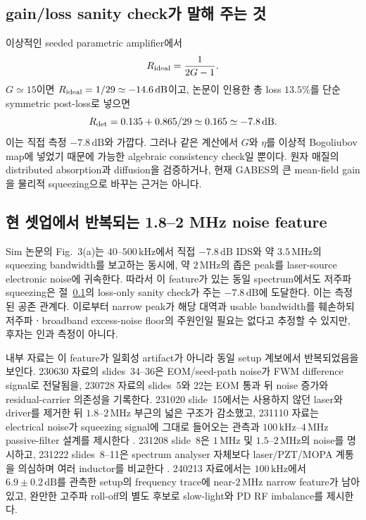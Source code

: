 \documentclass[11pt,a4paper]{article}
\newcommand{\MHz}{\,\mathrm{MHz}}
\newcommand{\kHz}{\,\mathrm{kHz}}
\newcommand{\dB}{\,\mathrm{dB}}
\begin{document}
\subsection{gain/loss sanity check가 말해 주는 것}
\label{sec:gain-loss-sanity}

이상적인 seeded parametric amplifier에서
\begin{equation}
R_{\rm ideal}=\frac{1}{2G-1}.
\end{equation}
$G\simeq15$이면 $R_{\rm ideal}=1/29\simeq-14.6\dB$이고, 논문이 인용한 총 loss
$13.5\%$를 단순 symmetric post-loss로 넣으면
\begin{equation}
R_{\rm det}=0.135+0.865/29\simeq0.165\simeq-7.8\dB.
\end{equation}
이는 직접 측정 $-7.8\dB$와 가깝다. 그러나 같은 계산에서 $G$와 $\eta$를 이상적
Bogoliubov map에 넣었기 때문에 가능한 algebraic consistency check일 뿐이다.
원자 매질의 distributed absorption과 diffusion을 검증하거나, 현재 GABES의 큰
mean-field gain을 물리적 squeezing으로 바꾸는 근거는 아니다.

\subsection{현 셋업에서 반복되는 1.8--2 MHz noise feature}
\label{sec:setup-2mhz}

Sim 논문의 Fig.~3(a)는 $40$--$500\kHz$에서 직접 $-7.8\dB$ IDS와 약
$3.5\MHz$의 squeezing bandwidth를 보고하는 동시에, 약 $2\MHz$의 좁은 peak를
laser-source electronic noise에 귀속한다\cite{Sim2025}. 따라서 이 feature가 있는
동일 spectrum에서도 저주파 squeezing은 절~\ref{sec:gain-loss-sanity}의
loss-only sanity check가 주는
$-7.8\dB$에 도달한다. 이는 측정된 공존 관계다. 이로부터 narrow peak가 해당 대역과
usable bandwidth를 훼손하되 저주파ㆍbroadband excess-noise floor의 주원인일 필요는
없다고 추정할 수 있지만, 후자는 인과 측정이 아니다.

내부 자료는 이 feature가 일회성 artifact가 아니라 동일 setup 계보에서 반복되었음을
보인다. 230630 자료의 slides~34--36은 EOM/seed-path noise가 FWM difference signal로
전달됨을, 230728 자료의 slides~5와 22는 EOM 통과 뒤 noise 증가와 residual-carrier
의존성을 기록한다\cite{SimLab230630,SimLab230728}. 231020 slide~15에서는 사용하지
않던 laser와 driver를 제거한 뒤 $1.8$--$2\MHz$ 부근의 넓은 구조가 감소했고,
231110 자료는 electrical noise가 squeezing signal에 그대로 들어오는 관측과
$100\kHz$--$4\MHz$ passive-filter 설계를 제시한다
\cite{SimLab231020,SimLab231110}. 231208 slide~8은 $1\MHz$ 및 $1.5$--$2\MHz$의
noise를 명시하고, 231222 slides~8--11은 spectrum analyser 자체보다
laser/PZT/MOPA 계통을 의심하며 여러 inductor를 비교한다
\cite{SimLab231208,SimLab231222}. 240213 자료에서는 $100\kHz$에서
$6.9\pm0.2\dB$를 관측한 setup의 frequency trace에 near-$2\MHz$ narrow feature가
남아 있고, 완만한 고주파 roll-off의 별도 후보로 slow-light와 PD RF imbalance를
제시한다\cite{SimLab240213}.
\end{document}
